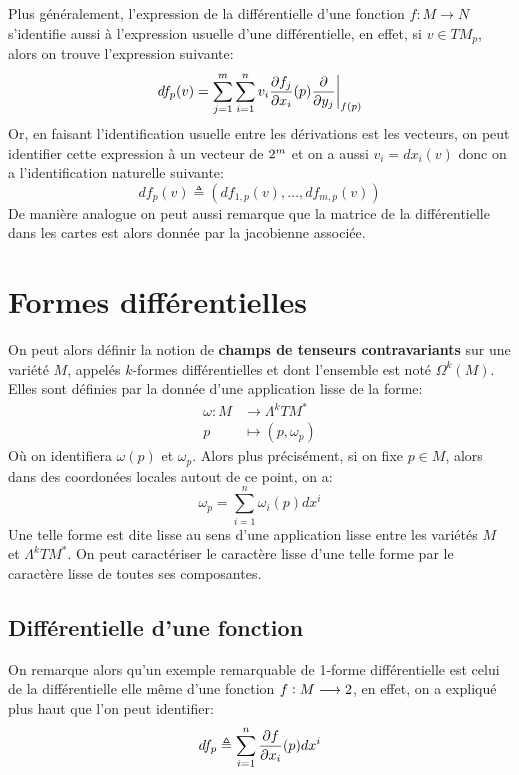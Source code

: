       Plus généralement, l'expression de la différentielle d'une fonction \( f : M \longrightarrow N \) s'identifie aussi à l'expression usuelle d'une différentielle, en effet, si \( v \in TM_p \), alors on trouve l'expression suivante:
      \[ 
         df_p(v) = \sum_{j=1}^m\sum_{i=1}^n v_i \frac{\partial f_j}{\partial x_i}(p)\frac{\partial }{\partial y_j}\biggr|_{f(p)}
      \]
      Or, en faisant l'identification usuelle entre les dérivations est les vecteurs, on peut identifier cette expression à un vecteur de \(2^m\) et on a aussi \( v_i = dx_i(v) \) donc on a l'identification naturelle suivante:
      \[ 
         df_p(v) \triangleq (df_{1, p}(v), \ldots, df_{m, p}(v))
      \]
      De manière analogue on peut aussi remarque que la matrice de la différentielle dans les cartes est alors donnée par la jacobienne associée.
\chapter{Formes différentielles}
   On peut alors définir la notion de \textbf{champs de tenseurs contravariants} sur une variété \( M \), appelés \( k \)-formes différentielles et dont l'ensemble est noté \( \Omega^k(M) \). Elles sont définies par la donnée d'une application lisse de la forme:
   \[ 
      \begin{aligned}
         \omega : M &\longrightarrow \Lambda^kTM^* \\
         p &\longmapsto (p, \omega_p)
      \end{aligned} 
   \]
   Où on identifiera \( \omega(p) \) et \(\omega_p\). Alors plus précisément, si on fixe \( p \in M \), alors dans des coordonées locales autout de ce point, on a:
   \[ 
      \omega_p = \sum_{i = 1}^n \omega_i(p) dx^i
   \]
   Une telle forme est dite lisse au sens d'une application lisse entre les variétés \( M \) et \( \Lambda^kTM^* \). On peut caractériser le caractère lisse d'une telle forme par le caractère lisse de toutes ses composantes.

   \section{Différentielle d'une fonction}
   On remarque alors qu'un exemple remarquable de 1-forme différentielle est celui de la différentielle elle même d'une fonction \( f : M \longrightarrow 2 \), en effet, on a expliqué plus haut que l'on peut identifier:
   \[ 
      df_p \triangleq \sum_{i=1}^n \frac{\partial f}{\partial x_i}(p)dx^i
   \]
